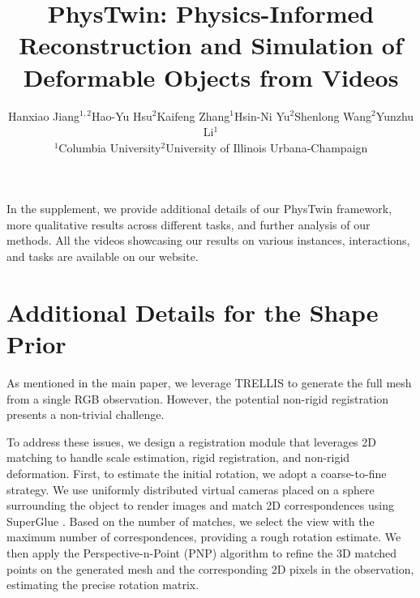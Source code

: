 \documentclass[10pt,twocolumn,letterpaper]{article}
\title{PhysTwin: Physics-Informed Reconstruction and Simulation of \\ Deformable Objects from Videos}
\author{Hanxiao Jiang$^{1, 2}$\quad Hao-Yu Hsu$^{2}$\quad Kaifeng Zhang$^1$\quad Hsin-Ni Yu$^2$\quad Shenlong Wang$^2$\quad Yunzhu Li$^1$ \\\small{$^1$Columbia University\quad $^2$University of Illinois Urbana-Champaign}}
\begin{document}
\maketitle
























{
    \small
    
    
}

\newpage
\appendix
{}
\setlength{\cftbeforesecskip}{2pt}
\renewcommand{\contentsname}{Supplement Index}
{
  \hypersetup{linkcolor=black}
  \tableofcontents
}

\vspace{5pt}

In the supplement, we provide additional details of our PhysTwin framework, more qualitative results across different tasks, and further analysis of our methods. All the videos showcasing our results on various instances, interactions, and tasks are available on our website.


\section{Additional Details for the Shape Prior}
As mentioned in the main paper, we leverage TRELLIS \cite{xiang2024structured} to generate the full mesh from a single RGB observation. However, the potential non-rigid registration presents a non-trivial challenge.

To address these issues, we design a registration module that leverages 2D matching to handle scale estimation, rigid registration, and non-rigid deformation. First, to estimate the initial rotation, we adopt a coarse-to-fine strategy. We use uniformly distributed virtual cameras placed on a sphere surrounding the object to render images and match 2D correspondences using SuperGlue \cite{sarlin2020superglue}. Based on the number of matches, we select the view with the maximum number of correspondences, providing a rough rotation estimate. We then apply the Perspective-n-Point (PNP) algorithm to refine the 3D matched points on the generated mesh and the corresponding 2D pixels in the observation, estimating the precise rotation matrix.
\end{document}
